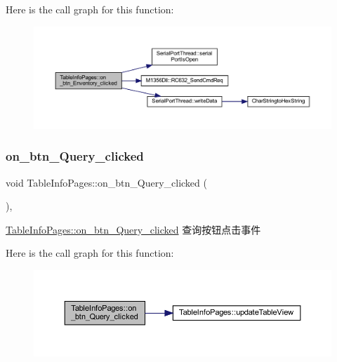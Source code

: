 Here is the call graph for this function\+:
\nopagebreak
\begin{figure}[H]
\begin{center}
\leavevmode
\includegraphics[width=350pt]{class_table_info_pages_aa65b69a9006eed0d90854eae510f2246_cgraph}
\end{center}
\end{figure}
\mbox{\label{class_table_info_pages_a22d86b2a8cb70049164f3d880f9f237a}} 
\subsubsection{\texorpdfstring{on\_btn\_Query\_clicked}{on\_btn\_Query\_clicked}}
{\footnotesize\ttfamily void Table\+Info\+Pages\+::on\+\_\+btn\+\_\+\+Query\+\_\+clicked (\begin{DoxyParamCaption}{ }\end{DoxyParamCaption})\hspace{0.3cm}{\ttfamily [private]}, {\ttfamily [slot]}}



\mbox{\hyperlink{class_table_info_pages_a22d86b2a8cb70049164f3d880f9f237a}{Table\+Info\+Pages\+::on\+\_\+btn\+\_\+\+Query\+\_\+clicked}} 查询按钮点击事件 

Here is the call graph for this function\+:
\nopagebreak
\begin{figure}[H]
\begin{center}
\leavevmode
\includegraphics[width=350pt]{class_table_info_pages_a22d86b2a8cb70049164f3d880f9f237a_cgraph}
\end{center}
\end{figure}
\mbox{\label{class_table_info_pages_aaa08abbcf7a0c7c76645896a9cdb610e}} 
